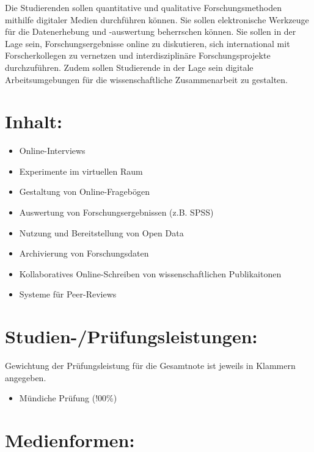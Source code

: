 Die Studierenden sollen quantitative und qualitative Forschungsmethoden
mithilfe digitaler Medien durchführen können. Sie sollen elektronische
Werkzeuge für die Datenerhebung und -auswertung beherrschen können. Sie
sollen in der Lage sein, Forschungsergebnisse online zu diskutieren,
sich international mit Forscherkollegen zu vernetzen und
interdisziplinäre Forschungsprojekte durchzuführen. Zudem sollen
Studierende in der Lage sein digitale Arbeitsumgebungen für die
wissenschaftliche Zusammenarbeit zu gestalten.

\section*{Inhalt:\label{/mi-2017/modulbeschreibungen-master/MA_SC_WPF_eScience}}\label{inhaltpathlabelmi-2017modulbeschreibungen-mastermaux5fscux5fwpfux5fescience}

\begin{itemize}
\tightlist
\item
  Online-Interviews
\item
  Experimente im virtuellen Raum
\item
  Gestaltung von Online-Fragebögen
\item
  Auswertung von Forschungsergebnissen (z.B. SPSS)
\item
  Nutzung und Bereitstellung von Open Data
\item
  Archivierung von Forschungsdaten
\item
  Kollaboratives Online-Schreiben von wissenschaftlichen Publikaitonen
\item
  Systeme für Peer-Reviews
\end{itemize}

\section*{Studien-/Prüfungsleistungen:\label{/mi-2017/modulbeschreibungen-master/MA_SC_WPF_eScience}}\label{studien-pruxfcfungsleistungenpathlabelmi-2017modulbeschreibungen-mastermaux5fscux5fwpfux5fescience}

Gewichtung der Prüfungsleistung für die Gesamtnote ist jeweils in
Klammern angegeben.

\begin{itemize}
\tightlist
\item
  Mündiche Prüfung (!00\%)
\end{itemize}

\section*{Medienformen:\label{/mi-2017/modulbeschreibungen-master/MA_SC_WPF_eScience}}\label{medienformenpathlabelmi-2017modulbeschreibungen-mastermaux5fscux5fwpfux5fescience}

